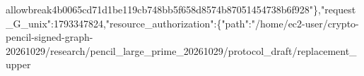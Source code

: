 \documentclass[10pt]{article}
\begin{document}
allowbreak{}4\allowbreak{}b\allowbreak{}0\allowbreak{}0\allowbreak{}6\allowbreak{}5\allowbreak{}c\allowbreak{}d\allowbreak{}7\allowbreak{}1\allowbreak{}d\allowbreak{}1\allowbreak{}b\allowbreak{}e\allowbreak{}1\allowbreak{}1\allowbreak{}9\allowbreak{}c\allowbreak{}b\allowbreak{}7\allowbreak{}4\allowbreak{}8\allowbreak{}b\allowbreak{}b\allowbreak{}5\allowbreak{}f\allowbreak{}6\allowbreak{}5\allowbreak{}8\allowbreak{}d\allowbreak{}8\allowbreak{}5\allowbreak{}7\allowbreak{}4\allowbreak{}b\allowbreak{}8\allowbreak{}7\allowbreak{}0\allowbreak{}5\allowbreak{}1\allowbreak{}4\allowbreak{}5\allowbreak{}4\allowbreak{}7\allowbreak{}3\allowbreak{}8\allowbreak{}b\allowbreak{}6\allowbreak{}f\allowbreak{}9\allowbreak{}2\allowbreak{}8\allowbreak{}"\allowbreak{}\}\allowbreak{},\allowbreak{}"\allowbreak{}r\allowbreak{}e\allowbreak{}q\allowbreak{}u\allowbreak{}e\allowbreak{}s\allowbreak{}t\allowbreak{}\_\allowbreak{}G\allowbreak{}\_\allowbreak{}u\allowbreak{}n\allowbreak{}i\allowbreak{}x\allowbreak{}"\allowbreak{}:\allowbreak{}1\allowbreak{}7\allowbreak{}9\allowbreak{}3\allowbreak{}3\allowbreak{}4\allowbreak{}7\allowbreak{}8\allowbreak{}2\allowbreak{}4\allowbreak{},\allowbreak{}"\allowbreak{}r\allowbreak{}e\allowbreak{}s\allowbreak{}o\allowbreak{}u\allowbreak{}r\allowbreak{}c\allowbreak{}e\allowbreak{}\_\allowbreak{}a\allowbreak{}u\allowbreak{}t\allowbreak{}h\allowbreak{}o\allowbreak{}r\allowbreak{}i\allowbreak{}z\allowbreak{}a\allowbreak{}t\allowbreak{}i\allowbreak{}o\allowbreak{}n\allowbreak{}"\allowbreak{}:\allowbreak{}\{\allowbreak{}"\allowbreak{}p\allowbreak{}a\allowbreak{}t\allowbreak{}h\allowbreak{}"\allowbreak{}:\allowbreak{}"\allowbreak{}/\allowbreak{}h\allowbreak{}o\allowbreak{}m\allowbreak{}e\allowbreak{}/\allowbreak{}e\allowbreak{}c\allowbreak{}2\allowbreak{}-\allowbreak{}u\allowbreak{}s\allowbreak{}e\allowbreak{}r\allowbreak{}/\allowbreak{}c\allowbreak{}r\allowbreak{}y\allowbreak{}p\allowbreak{}t\allowbreak{}o\allowbreak{}-\allowbreak{}p\allowbreak{}e\allowbreak{}n\allowbreak{}c\allowbreak{}i\allowbreak{}l\allowbreak{}-\allowbreak{}s\allowbreak{}i\allowbreak{}g\allowbreak{}n\allowbreak{}e\allowbreak{}d\allowbreak{}-\allowbreak{}g\allowbreak{}r\allowbreak{}a\allowbreak{}p\allowbreak{}h\allowbreak{}-\allowbreak{}2\allowbreak{}0\allowbreak{}2\allowbreak{}6\allowbreak{}1\allowbreak{}0\allowbreak{}2\allowbreak{}9\allowbreak{}/\allowbreak{}r\allowbreak{}e\allowbreak{}s\allowbreak{}e\allowbreak{}a\allowbreak{}r\allowbreak{}c\allowbreak{}h\allowbreak{}/\allowbreak{}p\allowbreak{}e\allowbreak{}n\allowbreak{}c\allowbreak{}i\allowbreak{}l\allowbreak{}\_\allowbreak{}l\allowbreak{}a\allowbreak{}r\allowbreak{}g\allowbreak{}e\allowbreak{}\_\allowbreak{}p\allowbreak{}r\allowbreak{}i\allowbreak{}m\allowbreak{}e\allowbreak{}\_\allowbreak{}2\allowbreak{}0\allowbreak{}2\allowbreak{}6\allowbreak{}1\allowbreak{}0\allowbreak{}2\allowbreak{}9\allowbreak{}/\allowbreak{}p\allowbreak{}r\allowbreak{}o\allowbreak{}t\allowbreak{}o\allowbreak{}c\allowbreak{}o\allowbreak{}l\allowbreak{}\_\allowbreak{}d\allowbreak{}r\allowbreak{}a\allowbreak{}f\allowbreak{}t\allowbreak{}/\allowbreak{}r\allowbreak{}e\allowbreak{}p\allowbreak{}l\allowbreak{}a\allowbreak{}c\allowbreak{}e\allowbreak{}m\allowbreak{}e\allowbreak{}n\allowbreak{}t\allowbreak{}\_\allowbreak{}u\allowbreak{}p\allowbreak{}p\allowbreak{}e\allowbreak{}r\allowbre
\end{document}
